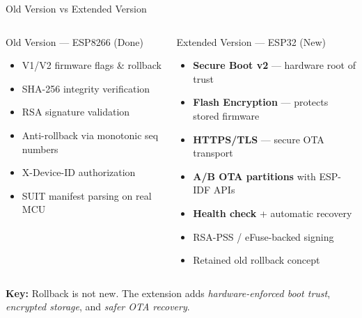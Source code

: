 \documentclass[aspectratio=169]{beamer}
\begin{document}
\begin{frame}{Old Version vs Extended Version}

\begin{columns}[T]
\begin{block}{Old Version --- ESP8266 (Done)}
\begin{itemize}\small
  \item V1/V2 firmware flags \& rollback
  \item SHA-256 integrity verification
  \item RSA signature validation
  \item Anti-rollback via monotonic seq numbers
  \item X-Device-ID authorization
  \item SUIT manifest parsing on real MCU
\end{itemize}
\end{block}

\begin{block}{Extended Version --- ESP32 (New)}
\begin{itemize}\small
  \item \textbf{Secure Boot v2} --- hardware root of trust
  \item \textbf{Flash Encryption} --- protects stored firmware
  \item \textbf{HTTPS/TLS} --- secure OTA transport
  \item \textbf{A/B OTA partitions} with ESP-IDF APIs
  \item \textbf{Health check} + automatic recovery
  \item RSA-PSS / eFuse-backed signing
  \item Retained old rollback concept
\end{itemize}
\end{block}
\end{columns}

\vspace{6pt}
\centering
{\small\textbf{Key:} Rollback is not new. The extension adds \emph{hardware-enforced boot trust}, \emph{encrypted storage}, and \emph{safer OTA recovery}.}

\end{frame}
\end{document}
